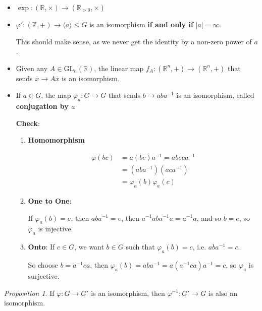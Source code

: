 \documentclass[12pt]{article}
\def\phi{\varphi}
\def\gl{\text{GL}}
\def\Z{{\mathbb Z}}
\def\R{{\mathbb R}}
\newcommand{\lr}[1]{\langle #1 \rangle}
\theoremstyle{remark}
\newtheorem{proposition}{Proposition}
\theoremstyle{remark}
\theoremstyle{remark}
\theoremstyle{remark}
\theoremstyle{remark}
\begin{document}
\begin{itemize}
	\item $\exp: (\R, \times) \to (\R_{> 0}, \times)$
	\item $\phi': (\Z, +) \to \lr {a} \le G$ is an isomorphism {\bf if and only
			      if} $|a| = \infty$.

	      This should make sense, as we never get the identity by a non-zero power of
	      $a$.

	\item Given any $A \in \gl_n(\R)$, the linear map $f_A: (\R^n, +) \to (\R^n,
		      +)$ that sends $\bar x \to A \bar x$ is an isomorphism.

	\item If $a \in G$, the map $\phi_a: G \to G$ that sends $b \to aba^{-1}$ is
	      an isomorphism, called {\bf conjugation by $a$}

		      {\bf Check}:

	      \begin{enumerate}
		      \item {\bf Homomorphism}

		            \begin{align*}
			            \phi(bc) & = a(bc)a^{-1} = abeca^{-1} \\
			                     & = (aba^{-1})(aca^{-1})     \\
			                     & = \phi_a(b)\phi_a(c)
		            \end{align*}

		      \item {\bf One to One}:

		            If $\phi_a(b) = e$, then $aba^{-1} = e$, then $a^{-1}aba^{-1}a =
			            a^{-1}a$, and so $b = e$, so $\phi_a$ is injective.

		      \item {\bf Onto}:
		            If $c \in G$, we want $b \in G$ such that $\phi_a(b) = c$, i.e.
		            $aba^{-1} = c$.

		            So choose $b = a^{-1}ca$, then $\phi_a(b) = aba^{-1} = a(a^{-1}ca)a^{-1}
			            = c$, so $\phi_a$ is surjective.
	      \end{enumerate}
\end{itemize}

\begin{proposition}
  If $\phi: G \to G'$ is an isomorphism, then $\phi^{-1}: G' \to G$ is also an
  isomorphism.
\end{proposition}
\end{document}
